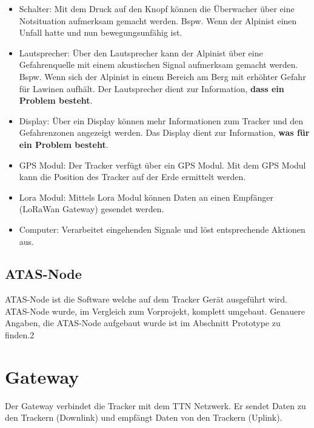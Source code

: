 \documentclass[11pt,english,german]{report}
\theoremstyle{definition}
\begin{document}
\begin{itemize}
	\item
	Schalter: Mit dem Druck auf den Knopf können die Überwacher über eine Notsituation aufmerksam gemacht werden. Bspw. Wenn der Alpinist einen Unfall hatte und nun bewegungsunfähig ist.
	\item
	Lautsprecher: Über den Lautsprecher kann der Alpinist über eine Gefahrenquelle mit einem akustischen Signal aufmerksam gemacht werden. Bspw. Wenn sich der Alpinist in einem Bereich am Berg mit erhöhter Gefahr für Lawinen aufhält. Der Lautsprecher dient zur Information, \textbf{dass ein Problem besteht}.
	\item
	Display: Über ein Display können mehr Informationen zum Tracker und den Gefahrenzonen angezeigt werden. Das Display dient zur Information, \textbf{was für ein Problem besteht}.
	\item
	GPS Modul: Der Tracker verfügt über ein GPS Modul. Mit dem GPS Modul kann die Position des Tracker auf der Erde ermittelt werden.
	\item 
	Lora Modul: Mittels Lora Modul können Daten an einen Empfänger (LoRaWan Gateway) gesendet werden.
	\item 
	Computer: Verarbeitet eingehenden Signale und löst entsprechende Aktionen aus.
\end{itemize}

\newpage
\subsection{ATAS-Node}
ATAS-Node ist die Software welche auf dem Tracker Gerät ausgeführt wird. ATAS-Node wurde, im Vergleich zum Vorprojekt, komplett umgebaut. Genauere Angaben, die ATAS-Node aufgebaut wurde ist im Abschnitt Prototype zu finden.2

\newpage
\section{Gateway}
Der Gateway verbindet die Tracker mit dem \gls{TTN} Netzwerk. Er sendet Daten zu den Trackern (\gls{Downlink}) und empfängt Daten von den Trackern (\gls{Uplink}).
\end{document}
